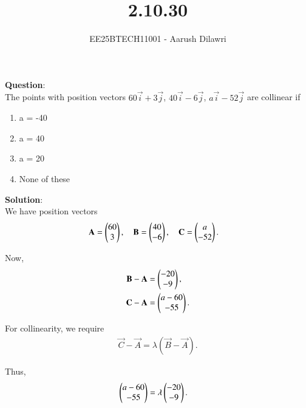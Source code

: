 \documentclass[journal]{IEEEtran}
\begin{document}

\vspace{3cm}

\title{2.10.30}
\author{EE25BTECH11001 - Aarush Dilawri}
{\let\newpage\relax\maketitle}

\renewcommand{\thefigure}{\theenumi}
\renewcommand{\thetable}{\theenumi}
\setlength{\intextsep}{10pt} %
\textbf{Question}:\\
The points with position vectors $60\vec{i} + 3\vec{j}$, $40\vec{i} - 6\vec{j}$, $a\vec{i} - 52\vec{j}$ are collinear if\\
\begin{multicols}{2}
\begin{enumerate}[label=(\alph*)]
    \item  a = -40
    \item  a = 40
    \item  a = 20
    \item  None of these
\end{enumerate}
\end{multicols}
\textbf{Solution}:\\
We have position vectors
\begin{align}
\mathbf{A} &= \begin{pmatrix}60 \\ 3\end{pmatrix}, \quad 
\mathbf{B} = \begin{pmatrix}40 \\ -6\end{pmatrix}, \quad 
\mathbf{C} = \begin{pmatrix}a \\ -52\end{pmatrix}.
\end{align}

Now,
\begin{align}
\mathbf{B} - \mathbf{A} &= \begin{pmatrix}-20 \\ -9\end{pmatrix}, \\
\mathbf{C} - \mathbf{A} &= \begin{pmatrix}a-60 \\ -55\end{pmatrix}.
\end{align}

For collinearity, we require
\begin{align}
\vec{C} - \vec{A} = \lambda (\vec{B} - \vec{A}).
\end{align}

Thus,
\begin{align}
\begin{pmatrix}a-60 \\ -55\end{pmatrix} &= \lambda \begin{pmatrix}-20 \\ -9\end{pmatrix}.
\end{align}
\end{document}
